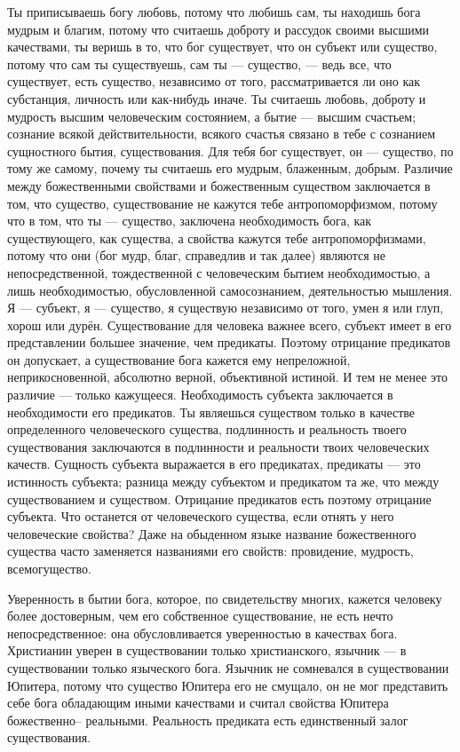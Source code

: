 \documentclass[12pt,oneside]{book}
\begin{document}
Ты приписываешь богу любовь, потому что любишь сам, ты находишь бога мудрым и благим, потому что считаешь доброту и рассудок своими высшими качествами, ты веришь в то, что бог существует, что он субъект или существо, потому что сам ты существуешь, сам ты --- существо, --- ведь все, что существует, есть существо, независимо от того, рассматривается ли оно как субстанция, личность или как-нибудь иначе. Ты считаешь любовь, доброту и мудрость высшим человеческим состоянием, а бытие --- высшим счастьем; сознание всякой действительности, всякого счастья связано в тебе с сознанием сущностного бытия, существования. Для тебя бог существует, он --- существо, по тому же самому, почему ты считаешь его мудрым, блаженным, добрым. Различие между божественными свойствами и божественным существом заключается в том, что существо, существование не кажутся тебе антропоморфизмом, потому что в том, что ты --- существо, заключена необходимость бога, как существующего, как существа, а свойства кажутся тебе антропоморфизмами, потому что они (бог мудр, благ, справедлив и так далее) являются не непосредственной, тождественной с человеческим бытием необходимостью, а лишь необходимостью, обусловленной самосознанием, деятельностью мышления. Я --- субъект, я --- существо, я существую независимо от того, умен я или глуп, хорош или дурён. Существование для человека важнее всего, субъект имеет в его представлении большее значение, чем предикаты. Поэтому отрицание предикатов он допускает, а существование бога кажется ему непреложной, неприкосновенной, абсолютно верной, объективной истиной. И тем не менее это различие --- только кажущееся. Необходимость субъекта заключается в необходимости его предикатов. Ты являешься существом только в качестве определенного человеческого существа, подлинность и реальность твоего существования заключаются в подлинности и реальности твоих человеческих качеств. Сущность субъекта выражается в его предикатах, предикаты --- это истинность субъекта; разница между субъектом и предикатом та же, что между существованием и существом. Отрицание предикатов есть поэтому отрицание субъекта. Что останется от человеческого существа, если отнять у него человеческие свойства? Даже на обыденном языке название божественного существа часто заменяется названиями его свойств: провидение, мудрость, всемогущество.

Уверенность в бытии бога, которое, по свидетельству многих, кажется человеку более достоверным, чем его собственное существование, не есть нечто непосредственное: она обусловливается уверенностью в качествах бога. Христианин уверен в существовании только христианского, язычник --- в существовании только языческого бога. Язычник не сомневался в существовании Юпитера, потому что существо Юпитера его не смущало, он не мог представить себе бога обладающим иными качествами и считал свойства Юпитера божественно– реальными. Реальность предиката есть единственный залог существования.
\end{document}
